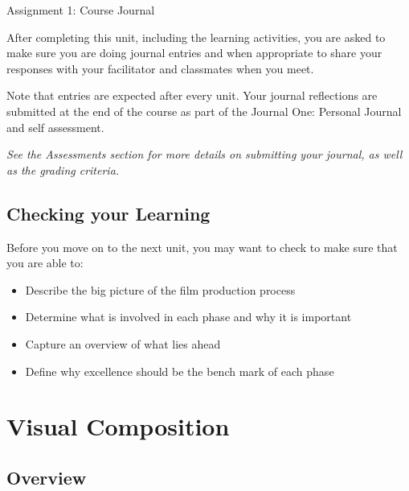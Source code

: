 \documentclass[
]{book}
\providecommand{\tightlist}{%
  \setlength{\itemsep}{0pt}\setlength{\parskip}{0pt}}
\begin{document}
\begin{assessment}
{Assignment 1: Course Journal}

After completing this unit, including the learning activities, you are asked to make sure you are doing journal entries and when appropriate to share your responses with your facilitator and classmates when you meet.

Note that entries are expected after every unit. Your journal reflections are submitted at the end of the course as part of the Journal One: Personal Journal and self assessment.

\emph{See the Assessments section for more details on submitting your journal, as well as the grading criteria.}
\end{assessment}

\hypertarget{checking-your-learning-1}{%
\section*{Checking your Learning}\label{checking-your-learning-1}}

\begin{progress}
Before you move on to the next unit, you may want to check to make sure that you are able to:

\begin{itemize}
\tightlist
\item
  Describe the big picture of the film production process\\
\item
  Determine what is involved in each phase and why it is important\\
\item
  Capture an overview of what lies ahead\\
\item
  Define why excellence should be the bench mark of each phase
\end{itemize}
\end{progress}

\hypertarget{visual-composition}{%
\chapter{Visual Composition}\label{visual-composition}}

\hypertarget{overview-2}{%
\section*{Overview}\label{overview-2}}
\end{document}
